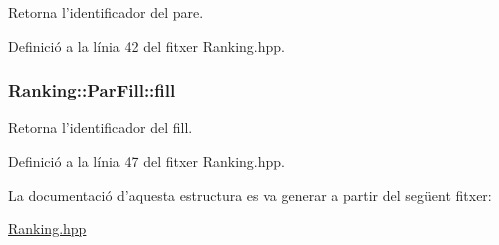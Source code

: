 Retorna l'identificador del pare. 



Definició a la línia 42 del fitxer Ranking.\-hpp.

\hypertarget{struct_ranking_1_1_par_fill_a3b20e448cd957e593268c84368529b05}{
\subsubsection[{fill}]{\setlength{\rightskip}{0pt plus 5cm}Ranking\-::\-Par\-Fill\-::fill}}\label{struct_ranking_1_1_par_fill_a3b20e448cd957e593268c84368529b05}


Retorna l'identificador del fill. 



Definició a la línia 47 del fitxer Ranking.\-hpp.



La documentació d'aquesta estructura es va generar a partir del següent fitxer\-:\begin{DoxyCompactItemize}
\item 
\hyperlink{_ranking_8hpp}{Ranking.\-hpp}\end{DoxyCompactItemize}
